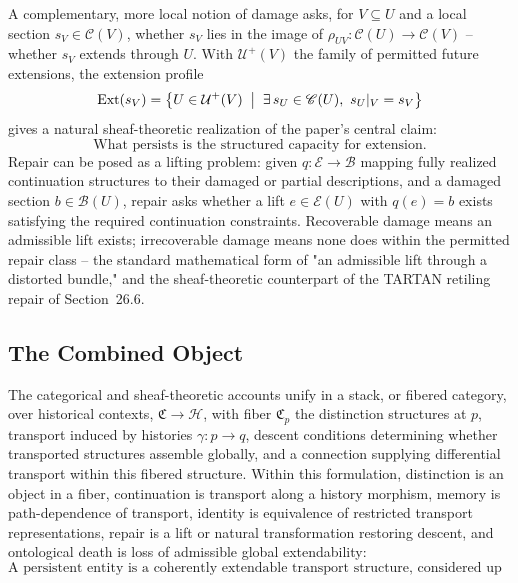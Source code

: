 \documentclass[11pt]{article}
\begin{document}
A complementary, more local notion of damage asks, for $V \subseteq U$ and a local section $s_V \in \mathscr{C}(V)$, whether $s_V$ lies in the image of $\rho_{UV} : \mathscr{C}(U) \to \mathscr{C}(V)$ -- whether $s_V$ extends through $U$. With $\mathcal{U}^+(V)$ the family of permitted future extensions, the extension profile
\[
\operatorname{Ext}(s_V) = \bigl\{ U \in \mathcal{U}^+(V) \;\bigm|\; \exists\, s_U \in \mathscr{C}(U),\ s_U|_V = s_V \bigr\}
\]
gives a natural sheaf-theoretic realization of the paper's central claim:
\[
\text{What persists is the structured capacity for extension.}
\]
Repair can be posed as a lifting problem: given $q : \mathscr{E} \to \mathscr{B}$ mapping fully realized continuation structures to their damaged or partial descriptions, and a damaged section $b \in \mathscr{B}(U)$, repair asks whether a lift $e \in \mathscr{E}(U)$ with $q(e) = b$ exists satisfying the required continuation constraints. Recoverable damage means an admissible lift exists; irrecoverable damage means none does within the permitted repair class -- the standard mathematical form of "an admissible lift through a distorted bundle," and the sheaf-theoretic counterpart of the TARTAN retiling repair of Section~26.6.

\subsection{The Combined Object}

The categorical and sheaf-theoretic accounts unify in a stack, or fibered category, over historical contexts, $\mathfrak{C} \to \mathcal{H}$, with fiber $\mathfrak{C}_p$ the distinction structures at $p$, transport induced by histories $\gamma : p \to q$, descent conditions determining whether transported structures assemble globally, and a connection supplying differential transport within this fibered structure. Within this formulation, distinction is an object in a fiber, continuation is transport along a history morphism, memory is path-dependence of transport, identity is equivalence of restricted transport representations, repair is a lift or natural transformation restoring descent, and ontological death is loss of admissible global extendability:
\[
\text{A persistent entity is a coherently extendable transport structure, considered up to the equivalences preserved by its constitutive tests.}
\]
\end{document}
